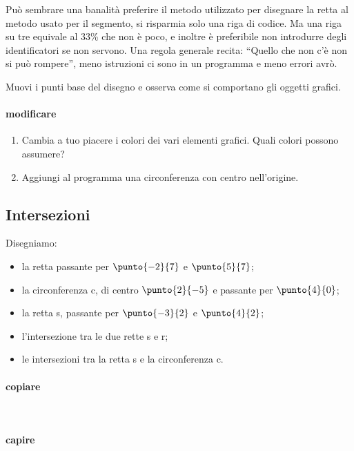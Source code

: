 \begin{osservazione}

Può sembrare una banalità preferire il metodo utilizzato per disegnare la 
retta al metodo usato per il segmento, si risparmia solo una riga di codice. 
Ma una riga su tre equivale al 33\% che non è poco, e inoltre è 
preferibile non introdurre degli identificatori se non servono. Una regola 
generale recita: ``Quello che non c'è non si può rompere'', meno istruzioni ci 
sono in un programma e meno errori avrò.

Muovi i punti base del disegno e osserva come si comportano gli oggetti grafici.
\end{osservazione}

\paragraph{modificare}
\begin{enumerate} [noitemsep]
 \item Cambia a tuo piacere i colori dei vari elementi grafici. Quali colori 
possono assumere?
 \item Aggiungi al programma una circonferenza con centro nell'origine.
\end{enumerate}

\subsection{Intersezioni}
\label{subsec:geo_int_intersezioni}
Disegniamo:
\begin{itemize} [nosep]
 \item la retta passante per \(\punto{-2}{7}\) e \(\punto{5}{7}\); 
 \item la circonferenza c, di centro \(\punto{2}{-5}\) e 
 passante per \(\punto{4}{0}\);
 \item la retta s, passante per \(\punto{-3}{2}\) e \(\punto{4}{2}\);
 \item l'intersezione tra le due rette s e r;
 \item le intersezioni tra la retta s e la circonferenza c. 
\end{itemize}

\paragraph{copiare}
{~}



\paragraph{capire}

